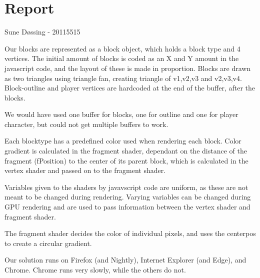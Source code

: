 \section{Report}

Sune Døssing - 20115515



Our blocks are represented as a block object, which holds a block type and 4 vertices.
The initial amount of blocks is coded as an X and Y amount in the javascript code,
and the layout of these is made in proportion.
Blocks are drawn as two triangles using triangle fan, creating triangle of v1,v2,v3 and v2,v3,v4.
Block-outline and player vertices are hardcoded at the end of the buffer, after the blocks.

We would have used one buffer for blocks, 
one for outline and one for player character, 
but could not get multiple buffers to work.


Each blocktype has a predefined color used when rendering each block.
Color gradient is calculated in the fragment shader, 
dependant on the distance of the fragment (fPosition) to the center of its parent block,
which is calculated in the vertex shader and passed on to the fragment shader.


Variables given to the shaders by javavscript code are uniform, 
as these are not meant to be changed during rendering.
Varying variables can be changed during GPU rendering and are 
used to pass information between the vertex shader and fragment shader.



The fragment shader decides the color of individual pixels, 
and uses the centerpos to create a circular gradient.


Our solution runs on Firefox (and Nightly), Internet Explorer (and Edge), and Chrome.
Chrome runs very slowly, while the others do not.